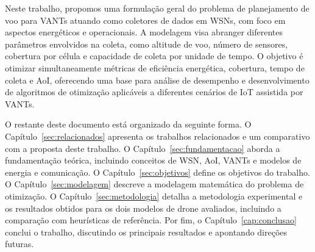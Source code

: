 Neste trabalho, propomos uma formulação geral do problema de planejamento de voo para VANTs atuando como coletores de dados em WSNs, com foco em aspectos energéticos e operacionais. A modelagem visa abranger diferentes parâmetros envolvidos na coleta, como altitude de voo, número de sensores, cobertura por célula e capacidade de coleta por unidade de tempo. O objetivo é otimizar simultaneamente métricas de eficiência energética, cobertura, tempo de coleta e AoI, oferecendo uma base para análise de desempenho e desenvolvimento de algoritmos de otimização aplicáveis a diferentes cenários de IoT assistida por VANTs.

O restante deste documento está organizado da seguinte forma. O Capítulo~\ref{sec:relacionados} apresenta os trabalhos relacionados e um comparativo com a proposta deste trabalho. O Capítulo~\ref{sec:fundamentacao} aborda a fundamentação teórica, incluindo conceitos de WSN, AoI, VANTs e modelos de energia e comunicação. O Capítulo~\ref{sec:objetivos} define os objetivos do trabalho. O Capítulo~\ref{sec:modelagem} descreve a modelagem matemática do problema de otimização. O Capítulo~\ref{sec:metodologia} detalha a metodologia experimental e os resultados obtidos para os dois modelos de drone avaliados, incluindo a comparação com heurísticas de referência. Por fim, o Capítulo~\ref{cap:conclusao} conclui o trabalho, discutindo os principais resultados e apontando direções futuras.
